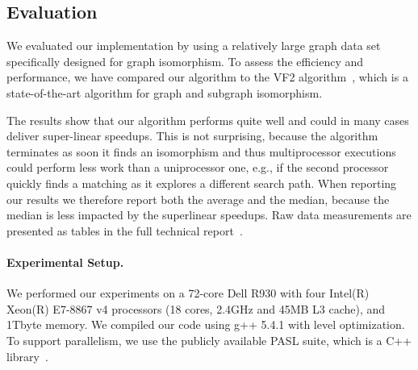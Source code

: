 \subsection{Evaluation}

We evaluated our implementation by using a relatively large graph data
set specifically designed for graph isomorphism.
%
To assess the efficiency and performance, we have compared our
algorithm to the VF2 algorithm~\cite{VF2}, which is a state-of-the-art
algorithm for graph and subgraph isomorphism.

The results show that our algorithm performs quite well and could in
many cases deliver super-linear speedups.
%
This is not surprising, because the algorithm terminates as soon it
finds an isomorphism and thus multiprocessor executions could perform
less work than a uniprocessor one, e.g., if the second processor
quickly finds a matching as it explores a different search path.
%
When reporting our results we therefore report both the average and
the median, because the median is less impacted by the superlinear
speedups.
%
Raw data measurements are presented as tables in the full
technical report~\cite{YA-iso-18}.

\paragraph{Experimental Setup.}
We performed our experiments on a 72-core Dell R930 with four Intel(R)
Xeon(R) E7-8867 v4 processors (18 cores, 2.4GHz and 45MB L3 cache),
and 1Tbyte memory.
%
%
We compiled our code using g++ 5.4.1 with  level optimization.
%
To support parallelism, we use the publicly available PASL suite,
which is a C++ library~\cite{acarchra13}.


